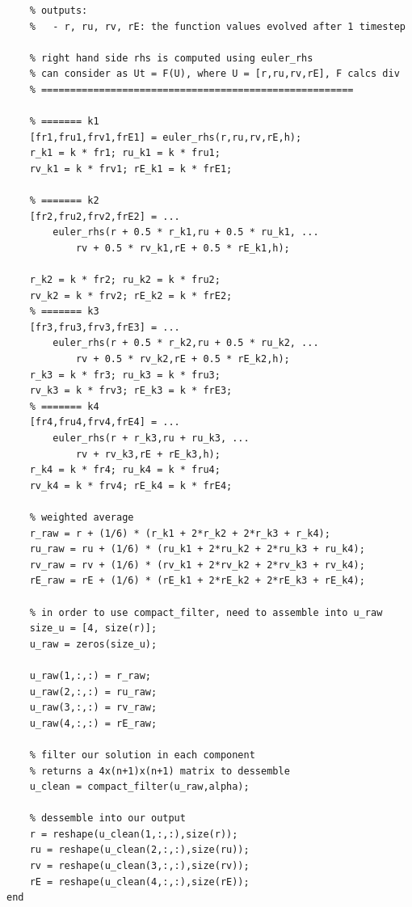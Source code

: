 \documentclass[12pt]{article}
\begin{document}
\begin{verbatim}
    % outputs:
    %   - r, ru, rv, rE: the function values evolved after 1 timestep

    % right hand side rhs is computed using euler_rhs
    % can consider as Ut = F(U), where U = [r,ru,rv,rE], F calcs div
    % ======================================================

    % ======= k1
    [fr1,fru1,frv1,frE1] = euler_rhs(r,ru,rv,rE,h);
    r_k1 = k * fr1; ru_k1 = k * fru1;
    rv_k1 = k * frv1; rE_k1 = k * frE1;

    % ======= k2
    [fr2,fru2,frv2,frE2] = ...
        euler_rhs(r + 0.5 * r_k1,ru + 0.5 * ru_k1, ...
            rv + 0.5 * rv_k1,rE + 0.5 * rE_k1,h);

    r_k2 = k * fr2; ru_k2 = k * fru2;
    rv_k2 = k * frv2; rE_k2 = k * frE2;
    % ======= k3
    [fr3,fru3,frv3,frE3] = ...
        euler_rhs(r + 0.5 * r_k2,ru + 0.5 * ru_k2, ...
            rv + 0.5 * rv_k2,rE + 0.5 * rE_k2,h);
    r_k3 = k * fr3; ru_k3 = k * fru3;
    rv_k3 = k * frv3; rE_k3 = k * frE3;
    % ======= k4
    [fr4,fru4,frv4,frE4] = ...
        euler_rhs(r + r_k3,ru + ru_k3, ...
            rv + rv_k3,rE + rE_k3,h);
    r_k4 = k * fr4; ru_k4 = k * fru4;
    rv_k4 = k * frv4; rE_k4 = k * frE4;

    % weighted average
    r_raw = r + (1/6) * (r_k1 + 2*r_k2 + 2*r_k3 + r_k4);
    ru_raw = ru + (1/6) * (ru_k1 + 2*ru_k2 + 2*ru_k3 + ru_k4);
    rv_raw = rv + (1/6) * (rv_k1 + 2*rv_k2 + 2*rv_k3 + rv_k4);
    rE_raw = rE + (1/6) * (rE_k1 + 2*rE_k2 + 2*rE_k3 + rE_k4);

    % in order to use compact_filter, need to assemble into u_raw
    size_u = [4, size(r)];
    u_raw = zeros(size_u);

    u_raw(1,:,:) = r_raw;
    u_raw(2,:,:) = ru_raw;
    u_raw(3,:,:) = rv_raw;
    u_raw(4,:,:) = rE_raw;

    % filter our solution in each component
    % returns a 4x(n+1)x(n+1) matrix to dessemble
    u_clean = compact_filter(u_raw,alpha);

    % dessemble into our output
    r = reshape(u_clean(1,:,:),size(r));
    ru = reshape(u_clean(2,:,:),size(ru));
    rv = reshape(u_clean(3,:,:),size(rv));
    rE = reshape(u_clean(4,:,:),size(rE));
end
\end{verbatim}
\end{document}
